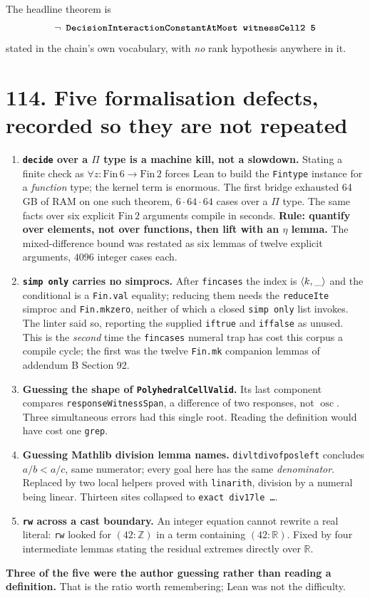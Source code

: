 \documentclass[9pt,twocolumn]{article}
\renewcommand{\_}{\CIGunderscore\allowbreak}
\begin{document}
The headline theorem is
\[
\texttt{\bfseries $\lnot$ DecisionInteractionConstantAtMost witnessCell2 5}
\]
stated in the chain's own vocabulary, with \emph{no} rank hypothesis anywhere in it.

\section*{114. Five formalisation defects, recorded so they are not repeated}
\begin{enumerate}
\item \textbf{\texttt{decide} over a $\Pi$ type is a machine kill, not a slowdown.} Stating a finite check as $\forall z:\mathrm{Fin}\,6\to\mathrm{Fin}\,2$ forces Lean to build the \texttt{Fintype} instance for a \emph{function} type; the kernel term is enormous. The first bridge exhausted 64\,GB of RAM on one such theorem, $6\cdot64\cdot64$ cases over a $\Pi$ type. The same facts over six explicit $\mathrm{Fin}\,2$ arguments compile in seconds. \textbf{Rule: quantify over elements, not over functions, then lift with an $\eta$ lemma.} The mixed-difference bound was restated as six lemmas of twelve explicit arguments, $4096$ integer cases each.
\item \textbf{\texttt{simp only} carries no simprocs.} After \texttt{fin\_cases} the index is $\langle k,\_\rangle$ and the conditional is a \texttt{Fin.val} equality; reducing them needs the \texttt{reduceIte} simproc and \texttt{Fin.mk\_zero}, neither of which a closed \texttt{simp only} list invokes. The linter said so, reporting the supplied \texttt{if\_true} and \texttt{if\_false} as unused. This is the \emph{second} time the \texttt{fin\_cases} numeral trap has cost this corpus a compile cycle; the first was the twelve \texttt{Fin.mk} companion lemmas of addendum B Section 92.
\item \textbf{Guessing the shape of \texttt{PolyhedralCellValid}.} Its last component compares \texttt{responseWitnessSpan}, a difference of two responses, not $\operatorname{osc}$. Three simultaneous errors had this single root. Reading the definition would have cost one \texttt{grep}.
\item \textbf{Guessing Mathlib division lemma names.} \texttt{div\_lt\_div\_of\_pos\_left} concludes $a/b<a/c$, same numerator; every goal here has the same \emph{denominator}. Replaced by two local helpers proved with \texttt{linarith}, division by a numeral being linear. Thirteen sites collapsed to \texttt{exact div17\_le \ldots}.
\item \textbf{\texttt{rw} across a cast boundary.} An integer equation cannot rewrite a real literal: \texttt{rw} looked for $(42:\mathbb{Z})$ in a term containing $(42:\mathbb{R})$. Fixed by four intermediate lemmas stating the residual extremes directly over $\mathbb{R}$.
\end{enumerate}
\textbf{Three of the five were the author guessing rather than reading a definition.} That is the ratio worth remembering; Lean was not the difficulty.
\end{document}

